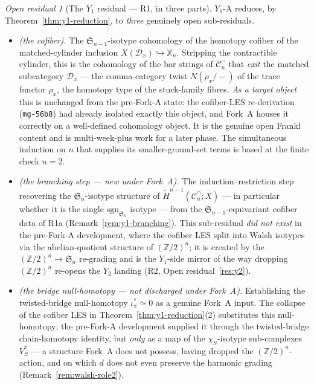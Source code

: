\documentclass[11pt,oneside]{amsart}
\theoremstyle{plain}
\theoremstyle{definition}
\theoremstyle{remark}
\theoremstyle{honeststyle}
\newtheorem{openresidual}[theorem]{Open residual}
\newcommand{\sgn}{\mathrm{sgn}}
\newcommand{\Sym}{\mathfrak{S}}
\newcommand{\Z}{\mathbb{Z}}
\newcommand{\Cn}{\mathcal{C}^{\cap}_n}
\newcommand{\Xbb}{\mathbb{X}}
\newcommand{\Dx}{\mathcal{D}_x}
\newcommand{\walsh}[1]{\chi_{#1}}
\begin{document}
\begin{openresidual}[The $Y_1$ residual --- R1, in three parts]
\label{res:y1}
$Y_1$-A reduces, by Theorem~\ref{thm:y1-reduction}, to \emph{three}
genuinely open sub-residuals.
\begin{itemize}[leftmargin=1.7em]
\item[\textbf{R1a}] \emph{(the cofiber).} The $\Sym_{n-1}$-isotype
  cohomology of the homotopy cofiber of the matched-cylinder inclusion
  $X(\Dx)\hookrightarrow\Xbb_n$. Stripping the contractible cylinder,
  this is the cohomology of the bar strings of $\Cn$ that \emph{exit}
  the matched subcategory $\Dx$ --- the comma-category twist
  $N(\rho_x/-)$ of the trace functor $\rho_x$, the homotopy type of
  the stuck-family fibres. \emph{As a target object} this is
  unchanged from the pre-Fork-A state: the cofiber-LES re-derivation
  (\texttt{mg-56b8}) had already isolated exactly this object, and
  Fork~A houses it correctly on a well-defined cohomology object. It
  is the genuine open Frankl content and is multi-week-plus work for a
  later phase. The simultaneous induction on $n$ that supplies its
  smaller-ground-set terms is based at the finite check $n=2$.
\item[\textbf{R1b}] \emph{(the branching step --- new under Fork~A).}
  The induction--restriction step recovering the $\Sym_n$-isotype
  structure of $\widetilde H^{n-1}(\Cn;X)$ --- in particular whether
  it is the single $\sgn_{\Sym_n}$ isotype --- from the
  $\Sym_{n-1}$-equivariant cofiber data of R1a
  (Remark~\ref{rem:y1-branching}). This sub-residual \emph{did not
  exist} in the pre-Fork-A development, where the cofiber LES split
  into Walsh isotypes via the abelian-quotient structure of
  $(\Z/2)^n$; it is created by the $(\Z/2)^n\to\Sym_n$ re-grading and
  is the $Y_1$-side mirror of the way dropping $(\Z/2)^n$ re-opens the
  $Y_2$ landing (R2, Open residual~\ref{res:y2}).
\item[\textbf{R1c}] \emph{(the bridge null-homotopy --- not
  discharged under Fork~A).} Establishing the twisted-bridge
  null-homotopy $\iota_x^{*}\simeq0$ as a genuine Fork~A input. The
  collapse of the cofiber LES in Theorem~\ref{thm:y1-reduction}(2)
  substitutes this null-homotopy; the pre-Fork-A development supplied
  it through the twisted-bridge chain-homotopy identity, but
  \emph{only} as a map of the $\walsh{S}$-isotype sub-complexes
  $V_S^{*}$ --- a structure Fork~A does not possess, having dropped
  the $(\Z/2)^n$-action, and on which $d$ does not even preserve the
  harmonic grading (Remark~\ref{rem:walsh-role2}).

\end{itemize}
\end{openresidual}
\end{document}
